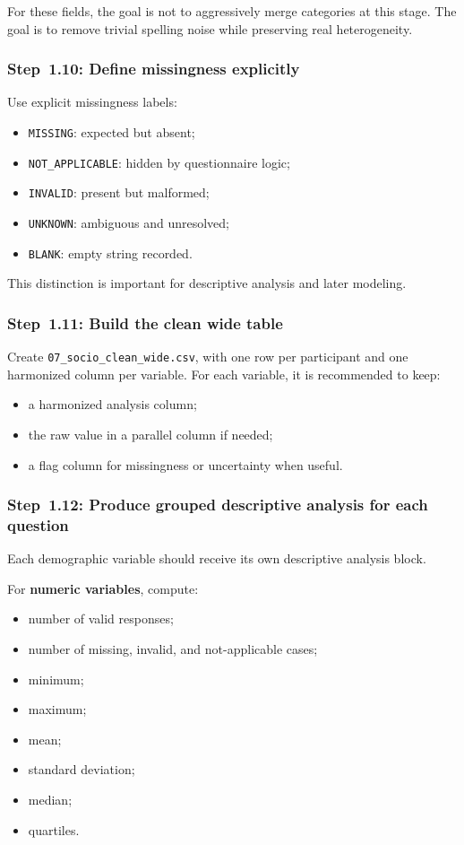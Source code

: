 \documentclass[11pt]{article}
\begin{document}
For these fields, the goal is not to aggressively merge categories at this stage.
The goal is to remove trivial spelling noise while preserving real heterogeneity.

\subsubsection{Step~1.10: Define missingness explicitly}
Use explicit missingness labels:
\begin{itemize}
    \item \texttt{MISSING}: expected but absent;
    \item \texttt{NOT\_APPLICABLE}: hidden by questionnaire logic;
    \item \texttt{INVALID}: present but malformed;
    \item \texttt{UNKNOWN}: ambiguous and unresolved;
    \item \texttt{BLANK}: empty string recorded.
\end{itemize}

This distinction is important for descriptive analysis and later modeling.

\subsubsection{Step~1.11: Build the clean wide table}
Create \texttt{07\_socio\_clean\_wide.csv}, with one row per participant and one harmonized column per variable.
For each variable, it is recommended to keep:
\begin{itemize}
    \item a harmonized analysis column;
    \item the raw value in a parallel column if needed;
    \item a flag column for missingness or uncertainty when useful.
\end{itemize}

\subsubsection{Step~1.12: Produce grouped descriptive analysis for each question}
Each demographic variable should receive its own descriptive analysis block.

For \textbf{numeric variables}, compute:
\begin{itemize}
    \item number of valid responses;
    \item number of missing, invalid, and not-applicable cases;
    \item minimum;
    \item maximum;
    \item mean;
    \item standard deviation;
    \item median;
    \item quartiles.
\end{itemize}
\end{document}
